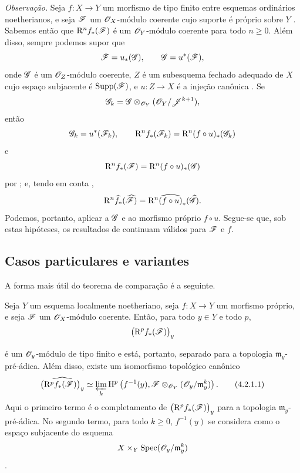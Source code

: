\begin{env}[4.1.10]
\label{III.4.1.10}
\emph{Observação.}
Seja $f:X\to Y$ um morfismo de tipo finito entre esquemas ordinários
noetherianos, e seja $\mathscr{F}$ um $\mathscr{O}_X$-módulo coerente cujo
suporte é próprio sobre $Y$ .
Sabemos então  que $\mathrm{R}^n f_*(\mathscr{F})$ é um
$\mathscr{O}_Y$-módulo coerente para todo $n\geq0$.
Além disso, sempre podemos supor que
\[
  \mathscr{F}=u_*(\mathscr{G}),
  \qquad
  \mathscr{G}=u^*(\mathscr{F}),
\]
onde $\mathscr{G}$ é um $\mathscr{O}_Z$-módulo coerente, $Z$ é um
subesquema fechado adequado de $X$ cujo espaço subjacente é
$\operatorname{Supp}(\mathscr{F})$, e $u:Z\to X$ é a injeção canônica
.
Se
\[
  \mathscr{G}_k
  =
  \mathscr{G}\otimes_{\mathscr{O}_Y}
  (\mathscr{O}_Y/\mathscr{J}^{k+1}),
\]
então
\[
  \mathscr{G}_k=u^*(\mathscr{F}_k),
  \qquad
  \mathrm{R}^n f_*(\mathscr{F}_k)
  =
  \mathrm{R}^n(f\circ u)_*(\mathscr{G}_k)
\]
e
\[
  \mathrm{R}^n f_*(\mathscr{F})
  =
  \mathrm{R}^n(f\circ u)_*(\mathscr{G})
\]
por ; e, tendo em conta ,
\[
  \mathrm{R}^n\widehat{f}_*(\widehat{\mathscr{F}})
  =
  \mathrm{R}^n\widehat{(f\circ u)}_*(\widehat{\mathscr{G}}).
\]
Podemos, portanto, aplicar  a $\mathscr{G}$ e ao morfismo
próprio $f\circ u$.
Segue-se que, sob estas hipóteses, os resultados de
 continuam válidos para $\mathscr{F}$ e $f$.
\end{env}


\subsection{Casos particulares e variantes}
\label{subsection:III.4.2}

A forma mais útil do teorema de comparação  é a
seguinte.

\begin{proposition}[4.2.1]
\label{III.4.2.1}
Seja $Y$ um esquema localmente noetheriano, seja $f:X\to Y$ um
morfismo próprio, e seja $\mathscr{F}$ um $\mathscr{O}_X$-módulo coerente.
Então, para todo $y\in Y$ e todo $p$,
\[
  \bigl(\mathrm{R}^p f_*(\mathscr{F})\bigr)_y
\]


é um $\mathscr{O}_y$-módulo de tipo finito e está, portanto, separado
para a topologia $\mathfrak{m}_y$-pré-ádica.
Além disso, existe um isomorfismo topológico canônico
\[
  \widehat{\bigl(\RR^p f_*(\sh{F})\bigr)_y}
  \isoto
  \varprojlim_k
  \HH^p\left(
    f^{-1}(y),
    \sh{F}\otimes_{\sh{O}_Y}
    (\sh{O}_y/\mathfrak{m}_y^k)
  \right).
  \tag{4.2.1.1}
  \label{III.4.2.1.1}
\]
Aqui o primeiro termo é o completamento de
$\bigl(\mathrm{R}^p f_*(\mathscr{F})\bigr)_y$ para a topologia
$\mathfrak{m}_y$-pré-ádica.
No segundo termo, para todo $k\geq0$, $f^{-1}(y)$ se considera
como o espaço subjacente do esquema
\[
  X\times_Y\operatorname{Spec}(\mathscr{O}_y/\mathfrak{m}_y^k)
\]
.
\end{proposition}

